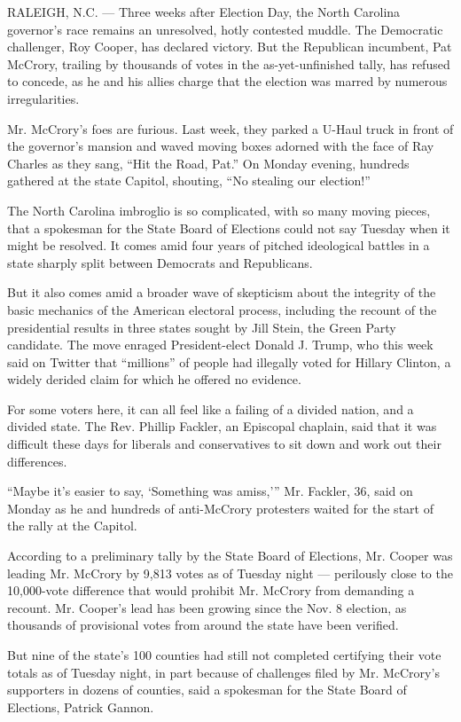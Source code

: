 RALEIGH, N.C. --- Three weeks after Election Day, the North Carolina
governor's race remains an unresolved, hotly contested muddle. The
Democratic challenger, Roy Cooper, has declared victory. But the
Republican incumbent, Pat McCrory, trailing by thousands of votes in the
as-yet-unfinished tally, has refused to concede, as he and his allies
charge that the election was marred by numerous irregularities.

Mr. McCrory's foes are furious. Last week, they parked a U-Haul truck in
front of the governor's mansion and waved moving boxes adorned with the
face of Ray Charles as they sang, ``Hit the Road, Pat.'' On Monday
evening, hundreds gathered at the state Capitol, shouting, ``No stealing
our election!''

The North Carolina imbroglio is so complicated, with so many moving
pieces, that a spokesman for the State Board of Elections could not say
Tuesday when it might be resolved. It comes amid four years of pitched
ideological battles in a state sharply split between Democrats and
Republicans.

But it also comes amid a broader wave of skepticism about the integrity
of the basic mechanics of the American electoral process, including the
recount of the presidential results in three states sought by Jill
Stein, the Green Party candidate. The move enraged President-elect
Donald J. Trump, who this week said on Twitter that ``millions'' of
people had illegally voted for Hillary Clinton, a widely derided claim
for which he offered no evidence.

For some voters here, it can all feel like a failing of a divided
nation, and a divided state. The Rev. Phillip Fackler, an Episcopal
chaplain, said that it was difficult these days for liberals and
conservatives to sit down and work out their differences.

``Maybe it's easier to say, `Something was amiss,''' Mr. Fackler, 36,
said on Monday as he and hundreds of anti-McCrory protesters waited for
the start of the rally at the Capitol.

According to a preliminary tally by the State Board of Elections, Mr.
Cooper was leading Mr. McCrory by 9,813 votes as of Tuesday night ---
perilously close to the 10,000-vote difference that would prohibit Mr.
McCrory from demanding a recount. Mr. Cooper's lead has been growing
since the Nov. 8 election, as thousands of provisional votes from around
the state have been verified.

But nine of the state's 100 counties had still not completed certifying
their vote totals as of Tuesday night, in part because of challenges
filed by Mr. McCrory's supporters in dozens of counties, said a
spokesman for the State Board of Elections, Patrick Gannon.

